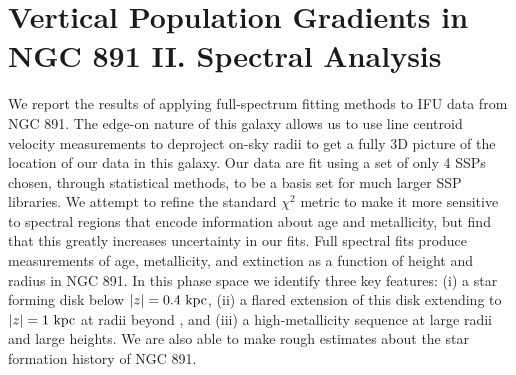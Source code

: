 
\chapter[NGC 891: Full Spectrum Analysis]{Vertical Population Gradients in NGC 891 II. Spectral Analysis}
\label{chap:891_2}

\cleardoublepage

\begin{chabstract}

  We report the results of applying full-spectrum fitting methods to
  IFU data from NGC 891. The edge-on nature of this galaxy allows us
  to use line centroid velocity measurements to deproject on-sky radii
  to get a fully 3D picture of the location of our data in this
  galaxy. Our data are fit using a set of only 4 SSPs chosen, through
  statistical methods, to be a basis set for much larger SSP
  libraries. We attempt to refine the standard $\chi^2$ metric to make
  it more sensitive to spectral regions that encode information about
  age and metallicity, but find that this greatly increases
  uncertainty in our fits. Full spectral fits produce measurements of
  age, metallicity, and extinction as a function of height and radius
  in NGC 891. In this phase space we identify three key features: (i)
  a star forming disk below $|z| = 0.4~\mathrm{kpc} $, (ii) a flared
  extension of this disk extending to $|z| = 1~\mathrm{kpc} $ at radii
  beyond , and (iii) a high-metallicity sequence at large
  radii and large heights. We are also able to make rough estimates
  about the star formation history of NGC 891.



\end{chabstract}

